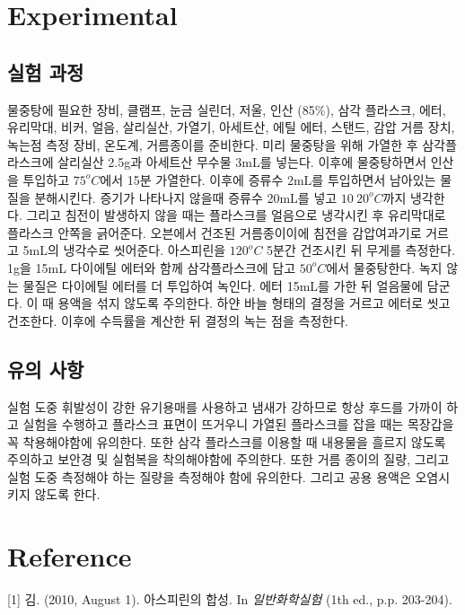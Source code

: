 \documentclass[%
 reprint,
 amsmath,amssymb,
 aps,
]{revtex4-2}
\begin{document}
\section{\label{sec:level1}Experimental}
\subsection{\label{sec:level2}실험 과정}
물중탕에 필요한 장비, 클램프, 눈금 실린더, 저울, 인산 (85\%), 삼각 플라스크, 에터, 유리막대, 비커, 얼음, 살리실산, 가열기, 아세트산, 에틸 에터, 스탠드, 감압 거름 장치, 녹는점 측정 장비, 온도계, 거름종이를 준비한다. 미리 물중탕을 위해 가열한 후 삼각플라스크에  살리실산 2.5g과 아세트산 무수물 3mL를 넣는다. 이후에 물중탕하면서 인산을 투입하고 $75^{o}C$에서 15분 가열한다. 이후에 증류수 2mL를 투입하면서 남아있는 물질을 분해시킨다. 증기가 나타나지 않을때 증류수 20mL를 넣고 $10~20^{o}C$까지 냉각한다. 그리고 침전이 발생하지 않을 때는 플라스크를 얼음으로 냉각시킨 후 유리막대로 플라스크 안쪽을 긁어준다. 오븐에서 건조된 거름종이이에 침전을 감압여과기로 거르고  5mL의 냉각수로 씻어준다. 아스피린을 $120^{o}C$ 5분간 건조시킨 뒤 무게를 측정한다. 1g을 15mL 다이에틸 에터와 함께 삼각플라스크에 담고 $50^{o}C$에서 물중탕한다. 녹지 않는 물질은 다이에틸 에터를 더 투입하여 녹인다. 에터 15mL를 가한 뒤 얼음물에 담군다. 이 때 용액을 섞지 않도록 주의한다. 하얀 바늘 형태의 결정을 거르고 에터로 씻고 건조한다. 이후에 수득률을 계산한 뒤 결정의 녹는 점을 측정한다. 

\subsection{\label{sec:level2}유의 사항}
실험 도중 휘발성이 강한 유기용매를 사용하고 냄새가 강하므로 항상 후드를 가까이 하고 실험을 수행하고 플라스크 표면이 뜨거우니 가열된 플라스크를 잡을 때는 목장갑을 꼭 착용해야함에 유의한다. 또한 삼각 플라스크를 이용할 때 내용물을 흘르지 않도록 주의하고 보안경 및 실험복을 착의해야함에 주의한다. 또한 거름 종이의 질량, 그리고 실험 도중 측정해야 하는 질량을 측정해야 함에 유의한다. 그리고 공용 용액은 오염시키지 않도록 한다.

\section{\label{sec:level1}Reference}
[1] 김. (2010, August 1). 아스피린의 합성. In \textit{일반화학실험} (1th ed., p.p. 203-204).
\end{document}
